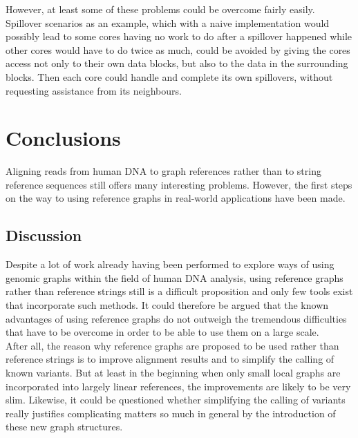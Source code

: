 \documentclass[a4paper,12pt,twoside,BCOR=10mm]{scrbook}
\begin{document}
However, at least some of these problems could be overcome fairly easily.
Spillover scenarios as an example, which with a naive
implementation would possibly lead to some cores having no work to do
after a spillover happened while other cores would have to do twice as much,
could be avoided by giving the cores access not only to their own data blocks,
but also to the data in the surrounding blocks. Then each core could handle
and complete its own spillovers, without requesting assistance from its neighbours.

\chapter{Conclusions}
%

Aligning reads from human DNA to graph references rather than to string reference sequences
still offers many interesting problems.
However, the first steps on the way to using reference graphs in real-world applications have been made.

\section{Discussion}

Despite a lot of work already having been performed to explore
ways of using genomic graphs within the field of human DNA analysis,
using reference graphs rather than reference strings still
is a difficult proposition and only few tools exist that incorporate
such methods.
It could therefore be argued that the known advantages of using reference
graphs do not outweigh the tremendous difficulties that have to
be overcome in order to be able to use them on a large scale. \\
After all, the reason why reference graphs are proposed to be used
rather than reference strings is to improve alignment results
and to simplify the calling of known variants.
But at least in the beginning when only small local graphs are incorporated
into largely linear references, the improvements are likely to be very slim.
Likewise, it could be questioned whether simplifying the calling of variants really
justifies complicating matters so much in general by the introduction of
these new graph structures.
\end{document}

